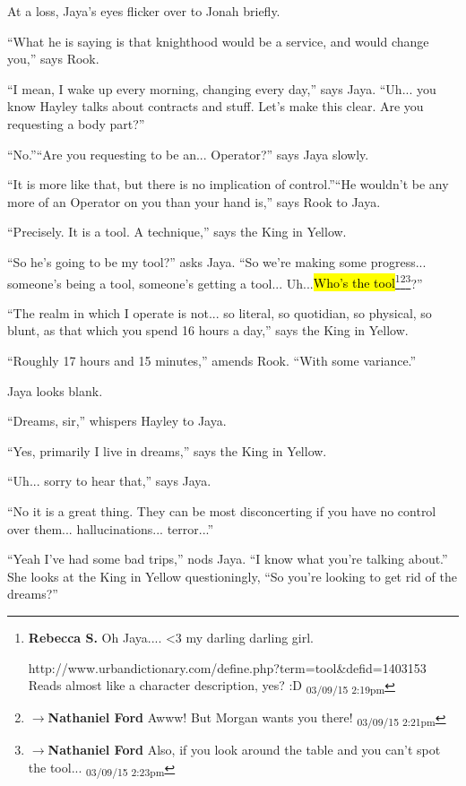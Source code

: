 At a loss, Jaya's eyes flicker over to Jonah briefly.

``What he is saying is that knighthood would be a service, and would change you,'' says Rook.

``I mean, I wake up every morning, changing every day,'' says Jaya.  ``Uh... you know Hayley talks about contracts and stuff.  Let's make this clear. Are you requesting a body part?''

``No.''``Are you requesting to be an... Operator?'' says Jaya slowly.

``It is more like that, but there is no implication of control.''``He wouldn't be any more of an Operator on you than your hand is,'' says Rook to Jaya.

``Precisely.  It is a tool.  A technique,'' says the King in Yellow.

``So he's going to be my tool?'' asks Jaya.  ``So we're making some progress... someone's being a tool, someone's getting a tool... Uh...\hl{Who's the tool}\footnote{\textbf{Rebecca S. }Oh Jaya.... \textless 3 my darling darling girl.

http://www.urbandictionary.com/define.php?term=tool\&defid=1403153 Reads almost like a character description, yes?  :D \textsubscript{03/09/15 2:19pm}}\footnote{$\rightarrow$\textbf{Nathaniel Ford }Awww! But Morgan wants you there! \textsubscript{03/09/15 2:21pm}}\footnote{$\rightarrow$\textbf{Nathaniel Ford }Also, if you look around the table and you can't spot the tool... \textsubscript{03/09/15 2:23pm}}?''

``The realm in which I operate is not... so literal, so quotidian, so physical, so blunt, as that which you spend 16 hours a day,'' says the King in Yellow.

``Roughly 17 hours and 15 minutes,'' amends Rook. ``With some variance.''

Jaya looks blank.

``Dreams, sir,'' whispers Hayley to Jaya.

``Yes, primarily I live in dreams,'' says the King in Yellow.

``Uh... sorry to hear that,'' says Jaya.

``No it is a great thing.  They can be most disconcerting if you have no control over them... hallucinations... terror...''

``Yeah I've had some bad trips,'' nods Jaya.  ``I know what you're talking about.''  She looks at the King in Yellow questioningly, ``So you're looking to get rid of the dreams?''

